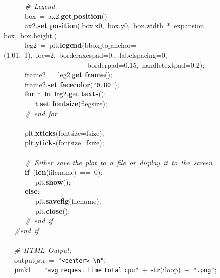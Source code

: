 \mbox{}\ \ \ \ \ \ \textit{\#\ Legend} \\
\mbox{}\ \ \ \ \ \ box\ =\ ax2.\textbf{get$\_$position}() \\
\mbox{}\ \ \ \ \ \ ax2.\textbf{set$\_$position}([box.x0,\ box.y0,\ box.width\ *\ expansion$\_$box,\ box.height]) \\
\mbox{}\ \ \ \ \ \ leg2\ =\ plt.\textbf{legend}(bbox$\_$to$\_$anchor=(1.01,\ 1),\ loc=2,\ borderaxespad=0.,\ labelspacing=0,\  \\
\mbox{}\ \ \ \ \ \ \ \ \ \ \ \ \ \ \ \ \ \ \ \ \ \ \ \ borderpad=0.15,\ handletextpad=0.2); \\
\mbox{}\ \ \ \ \ \ frame2\ =\ leg2.\textbf{get$\_$frame}(); \\
\mbox{}\ \ \ \ \ \ frame2.\textbf{set$\_$facecolor}(\texttt{"{}0.80"{}}); \\
\mbox{}\ \ \ \ \ \ \textbf{for}\ t\ \textbf{in}\ leg2.\textbf{get$\_$texts}(): \\
\mbox{}\ \ \ \ \ \ \ \ \ t.\textbf{set$\_$fontsize}(flegsize); \\
\mbox{}\ \ \ \ \ \ \textit{\#\ end\ for} \\
\mbox{}\ \ \ \ \ \  \\
\mbox{}\ \ \ \ \ \ plt.\textbf{xticks}(fontsize=fsize); \\
\mbox{}\ \ \ \ \ \ plt.\textbf{yticks}(fontsize=fsize); \\
\mbox{}\ \ \ \ \ \  \\
\mbox{}\ \ \ \ \ \ \textit{\#\ Either\ save\ the\ plot\ to\ a\ file\ or\ display\ it\ to\ the\ screen} \\
\mbox{}\ \ \ \ \ \ \textbf{if}\ (\textbf{len}(filename)\ ==\ 0): \\
\mbox{}\ \ \ \ \ \ \ \ \ plt.\textbf{show}(); \\
\mbox{}\ \ \ \ \ \ \textbf{else}: \\
\mbox{}\ \ \ \ \ \ \ \ \ plt.\textbf{savefig}(filename); \\
\mbox{}\ \ \ \ \ \ \ \ \ plt.\textbf{close}(); \\
\mbox{}\ \ \ \ \ \ \textit{\#\ end\ if} \\
\mbox{}\ \ \ \textit{\#end\ if} \\
\mbox{}\ \ \  \\
\mbox{}\ \ \ \textit{\#\ HTML\ Output:} \\
\mbox{}\ \ \ output$\_$str\ =\ \texttt{"{}\textless{}center\textgreater{}\ \textbackslash{}n"{}}; \\
\mbox{}\ \ \ junk1\ =\ \texttt{"{}avg$\_$request$\_$time$\_$total$\_$cpu"{}}\ +\ \textbf{str}(iloop)\ +\ \texttt{"{}.png"{}}; \\
